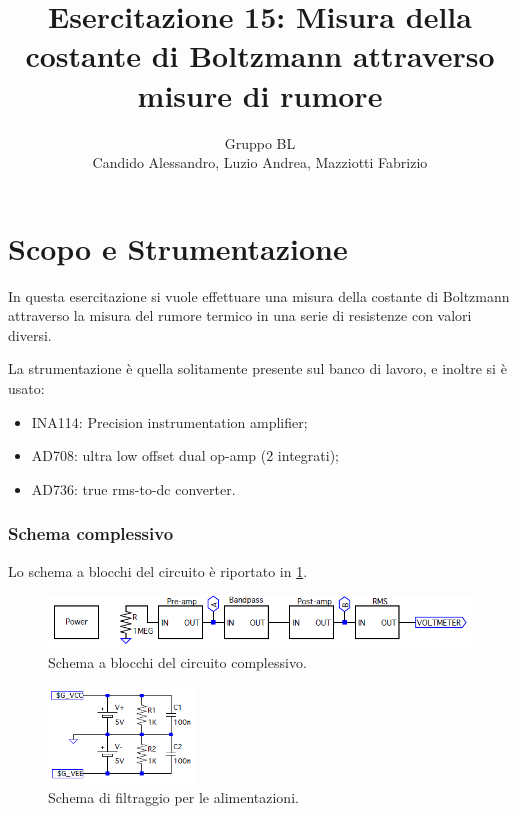\documentclass[a4paper,10pt]{article}
\title{Esercitazione 15: Misura della costante di Boltzmann attraverso misure di rumore}
\author{Gruppo BL \\ Candido Alessandro, Luzio Andrea, Mazziotti Fabrizio}
\begin{document}
\maketitle

\section{Scopo e Strumentazione}
In questa esercitazione si vuole effettuare una misura della costante di Boltzmann attraverso la
misura del rumore termico in una serie di resistenze con valori diversi.

\noindent La strumentazione è quella solitamente presente sul banco di lavoro, e inoltre si è usato:
\begin{itemize}
	\item INA114: Precision instrumentation amplifier;
	\item AD708: ultra low offset dual op-amp (2 integrati);
	\item AD736: true rms-to-dc converter.
\end{itemize}

\subsubsection*{Schema complessivo}

Lo schema a blocchi del circuito è riportato in \cref{fig:blocks}.

\begin{figure}[H]
	\centering
	\includegraphics[width=\textwidth]{../grafici/Blocks.png}
	\vspace*{10pt}
	\caption{Schema a blocchi del circuito complessivo.}
	\label{fig:blocks}
\end{figure}

\begin{figure}
	\vspace{-10pt}
	\centering
	\includegraphics[width=0.35\textwidth]{../grafici/Filter.png}
	\vspace{-6pt}
	\caption{Schema di filtraggio per le alimentazioni.}
	\label{fig:powamp}
	\vspace{-12pt}
\end{figure}
\end{document}
